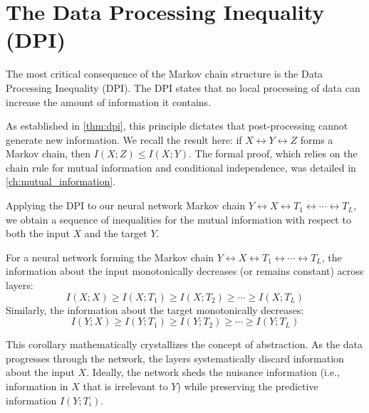 \section{The Data Processing Inequality (DPI)}

The most critical consequence of the Markov chain structure is the Data Processing Inequality (DPI). The DPI states that no local processing of data can increase the amount of information it contains.

As established in \cref{thm:dpi}, this principle dictates that post-processing cannot generate new information. We recall the result here: if $X \leftrightarrow Y \leftrightarrow Z$ forms a Markov chain, then $I(X; Z) \le I(X; Y)$. The formal proof, which relies on the chain rule for mutual information and conditional independence, was detailed in \cref{ch:mutual_information}.

Applying the DPI to our neural network Markov chain $Y \leftrightarrow X \leftrightarrow T_1 \leftrightarrow \cdots \leftrightarrow T_L$, we obtain a sequence of inequalities for the mutual information with respect to both the input $X$ and the target $Y$.

\begin{corollary}
For a neural network forming the Markov chain $Y \leftrightarrow X \leftrightarrow T_1 \leftrightarrow \cdots \leftrightarrow T_L$, the information about the input monotonically decreases (or remains constant) across layers:
\[ I(X; X) \ge I(X; T_1) \ge I(X; T_2) \ge \cdots \ge I(X; T_L) \]
Similarly, the information about the target monotonically decreases:
\[ I(Y; X) \ge I(Y; T_1) \ge I(Y; T_2) \ge \cdots \ge I(Y; T_L) \]
\end{corollary}

This corollary mathematically crystallizes the concept of abstraction. As the data progresses through the network, the layers systematically discard information about the input $X$. Ideally, the network sheds the nuisance information (i.e., information in $X$ that is irrelevant to $Y$) while preserving the predictive information $I(Y; T_i)$. 

